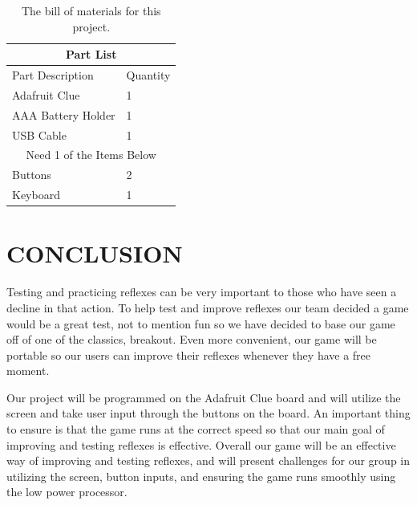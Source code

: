 \documentclass[12pt]{article}
\begin{document}
\begin{table}
\centering
\begin{tabular}{ |p{4cm}|p{1.5cm}|}
\hline
\multicolumn{2}{|c|}{Part List} \\
\hline
Part Description& Quantity \\
\hline
Adafruit Clue & 1 \\
AAA Battery Holder & 1 \\
USB Cable &1 \\
\hline
\multicolumn{2}{|c|}{Need 1 of the Items Below} \\
\hline
Buttons & 2 \\
Keyboard & 1 \\
\hline
\end{tabular}
\caption{The bill of materials for this project.}
\label{table:BOM}
\end{table}










\section{CONCLUSION}
Testing and practicing reflexes can be very important to those who have seen a decline in that action. To help test and improve reflexes our team decided a game would be a great test, not to mention fun so we have decided to base our game off of one of the classics, breakout. Even more convenient, our game will be portable so our users can improve their reflexes whenever they have a free moment. 

Our project will be programmed on the Adafruit Clue board and will utilize the screen and take user input through the buttons on the board. An important thing to ensure is that the game runs at the correct speed so that our main goal of improving and testing reflexes is effective. Overall our game will be an effective way of improving and testing reflexes, and will present challenges for our group in utilizing the screen, button inputs, and ensuring the game runs smoothly using the low power processor.


\newpage
\printbibliography[heading=subbibintoc]
%
%
\end{document}
